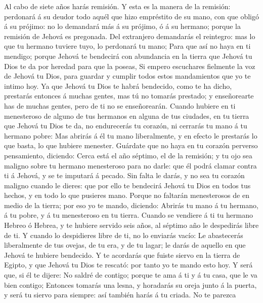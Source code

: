  Al cabo de siete años harás remisión.  Y
esta es la manera de la remisión: perdonará á su deudor todo aquél que
hizo empréstito de su mano, con que obligó á su prójimo: no lo demandará
más á su prójimo, ó á su hermano; porque la remisión de Jehová es
pregonada.  Del extranjero demandarás el reintegro: mas lo
que tu hermano tuviere tuyo, lo perdonará tu mano;  Para
que así no haya en ti mendigo; porque Jehová te bendecirá con abundancia
en la tierra que Jehová tu Dios te da por heredad para que la poseas,
 Si empero escuchares fielmente la voz de Jehová tu Dios,
para guardar y cumplir todos estos mandamientos que yo te intimo hoy.
 Ya que Jehová tu Dios te habrá bendecido, como te ha
dicho, prestarás entonces á muchas gentes, mas tú no tomarás prestado; y
enseñorearte has de muchas gentes, pero de ti no se enseñorearán.
 Cuando hubiere en ti menesteroso de alguno de tus
hermanos en alguna de tus ciudades, en tu tierra que Jehová tu Dios te
da, no endurecerás tu corazón, ni cerrarás tu mano á tu hermano pobre:
 Mas abrirás á él tu mano liberalmente, y en efecto le
prestarás lo que basta, lo que hubiere menester.  Guárdate
que no haya en tu corazón perverso pensamiento, diciendo: Cerca está el
año séptimo, el de la remisión; y tu ojo sea maligno sobre tu hermano
menesteroso para no darle: que él podrá clamar contra ti á Jehová, y se
te imputará á pecado.  Sin falta le darás, y no sea tu
corazón maligno cuando le dieres: que por ello te bendecirá Jehová tu
Dios en todos tus hechos, y en todo lo que pusieres mano.
 Porque no faltarán menesterosos de en medio de la
tierra; por eso yo te mando, diciendo: Abrirás tu mano á tu hermano, á
tu pobre, y á tu menesteroso en tu tierra.  Cuando se
vendiere á ti tu hermano Hebreo ó Hebrea, y te hubiere servido seis
años, al séptimo año le despedirás libre de ti.  Y cuando
lo despidieres libre de ti, no lo enviarás vacío:  Le
abastecerás liberalmente de tus ovejas, de tu era, y de tu lagar; le
darás de aquello en que Jehová te hubiere bendecido.  Y
te acordarás que fuiste siervo en la tierra de Egipto, y que Jehová tu
Dios te rescató: por tanto yo te mando esto hoy.  Y será
que, si él te dijere: No saldré de contigo; porque te ama á ti y á tu
casa, que le va bien contigo;  Entonces tomarás una
lesna, y horadarás su oreja junto á la puerta, y será tu siervo para
siempre: así también harás á tu criada.  No te parezca
